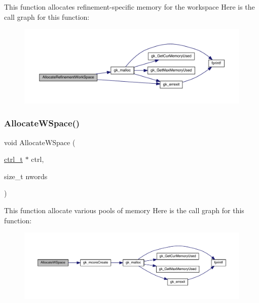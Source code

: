 This function allocates refinement-\/specific memory for the workspace Here is the call graph for this function\+:\nopagebreak
\begin{figure}[H]
\begin{center}
\leavevmode
\includegraphics[width=350pt]{a00951_a2b337cc68be55b7e8b6d2218fcea855d_cgraph}
\end{center}
\end{figure}
\mbox{\label{a00951_aaedfa12582d61baba3729f8204d9fddb}} 
\subsubsection{\texorpdfstring{Allocate\+W\+Space()}{AllocateWSpace()}}
{\footnotesize\ttfamily void Allocate\+W\+Space (\begin{DoxyParamCaption}\item[{\hyperlink{a00742}{ctrl\+\_\+t} $\ast$}]{ctrl,  }\item[{size\+\_\+t}]{nwords }\end{DoxyParamCaption})}

This function allocate various pools of memory Here is the call graph for this function\+:\nopagebreak
\begin{figure}[H]
\begin{center}
\leavevmode
\includegraphics[width=350pt]{a00951_aaedfa12582d61baba3729f8204d9fddb_cgraph}
\end{center}
\end{figure}
\mbox{\label{a00951_a63cadc298b93f90fc2b8fbf9f4771f11}} 
